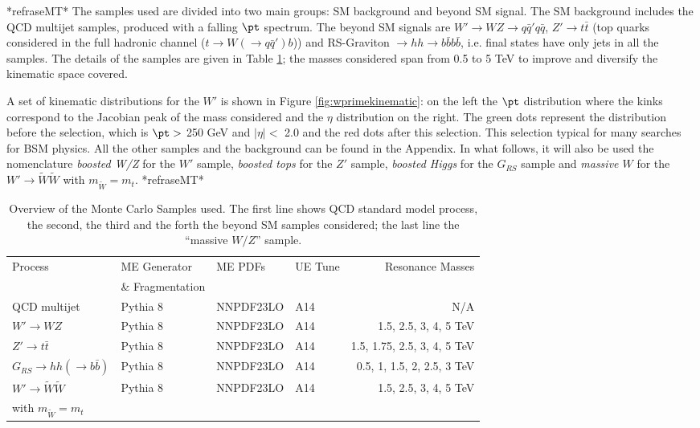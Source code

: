 \documentclass[UKenglish,texlive=2013]{\ATLASLATEXPATH atlasdoc}
\begin{document}
*refraseMT*
The samples used are divided into two main groups: SM background and beyond SM signal. The SM background includes the QCD multijet samples, produced with a falling $\pt$ spectrum. The beyond SM signals are $W'\to WZ\to q\bar{q}'q\bar{q}$, $Z'\to t\bar{t}$ (top quarks considered in the full hadronic channel ($t\to W(\to q\bar{q}')b$)) and RS-Graviton $\to hh \to b\bar{b}b\bar{b}$, i.e. final states have only jets in all the samples. The details of the samples are given in Table \ref{tab:mcsamples}; the masses considered span from 0.5 to 5 TeV to improve and diversify the kinematic space covered.

A set of kinematic distributions for the $W'$ is shown in Figure \ref{fig:wprimekinematic}: on the left the $\pt$ distribution where the kinks correspond to the Jacobian peak of the mass considered and the $\eta$ distribution on the right. The green dots represent the distribution before the selection, which is $\pt >$ 250 GeV and $|\eta|<$ 2.0 and the red dots after this selection. This selection typical for many searches for BSM physics.  All the other samples and the background can be found in the Appendix. 
In what follows, it will also be used the nomenclature \textit{boosted W/Z} for the $W'$ sample, \textit{boosted tops} for the $Z'$ sample, \textit{boosted Higgs} for the $G_{RS}$ sample and \textit{massive $W$} for the $W' \to \tilde{W}\tilde{W}$ with $m_{\tilde{W}}=m_t$.
*refraseMT*

\begin{table}
\hspace*{-3em}\begin{tabular}{l|lllr}  
\hline
\hline
Process & ME Generator & ME PDFs &  UE Tune & Resonance Masses\\
  & \& Fragmentation &  & & \\

\hline
QCD multijet &Pythia 8&NNPDF23LO & A14& N/A \\
\hline
$W'\to WZ$ &Pythia 8&NNPDF23LO & A14& 1.5, 2.5, 3, 4, 5 TeV \\
\cline{1-1}
$Z'\to t\bar{t}$ &Pythia 8&NNPDF23LO & A14& 1.5, 1.75, 2.5, 3, 4, 5 TeV \\
\cline{1-1}
$G_{RS} \to hh(\to b\bar{b})$ &Pythia 8&NNPDF23LO & A14& 0.5, 1, 1.5, 2, 2.5, 3 TeV\\
\cline{1-1}
$W' \to \tilde{W}\tilde{W}$ &Pythia 8&NNPDF23LO & A14& 1.5, 2.5, 3, 4, 5 TeV \\
with $m_{\tilde{W}}=m_t$ & & & & \\
\hline
\hline
\end{tabular}
\caption[Overview of the Monte Carlo Samples used]{Overview of the Monte Carlo Samples used. The first line shows QCD standard model process, the second, the third and the forth the beyond SM samples considered; the last line the ``massive $W/Z$'' sample.}
\label{tab:mcsamples}
\end{table}
\end{document}
